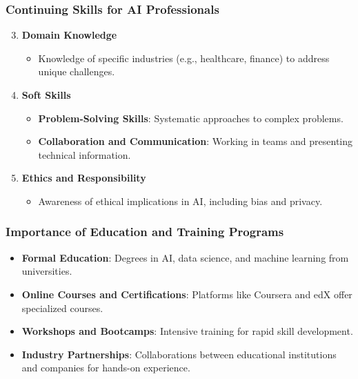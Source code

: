 \documentclass{beamer}
\begin{document}
\begin{frame}[fragile]
    \frametitle{Continuing Skills for AI Professionals}
    \begin{enumerate}
        \setcounter{enumi}{2} %
        \item \textbf{Domain Knowledge}
            \begin{itemize}
                \item Knowledge of specific industries (e.g., healthcare, finance) to address unique challenges.
            \end{itemize}
            
        \item \textbf{Soft Skills}
            \begin{itemize}
                \item \textbf{Problem-Solving Skills}: Systematic approaches to complex problems.
                \item \textbf{Collaboration and Communication}: Working in teams and presenting technical information.
            \end{itemize}

        \item \textbf{Ethics and Responsibility}
            \begin{itemize}
                \item Awareness of ethical implications in AI, including bias and privacy.
            \end{itemize}
    \end{enumerate}
\end{frame}

\begin{frame}[fragile]
    \frametitle{Importance of Education and Training Programs}
    \begin{itemize}
        \item \textbf{Formal Education}: Degrees in AI, data science, and machine learning from universities.
        \item \textbf{Online Courses and Certifications}: Platforms like Coursera and edX offer specialized courses.
        \item \textbf{Workshops and Bootcamps}: Intensive training for rapid skill development.
        \item \textbf{Industry Partnerships}: Collaborations between educational institutions and companies for hands-on experience.
    \end{itemize}
\end{frame}
\end{document}
